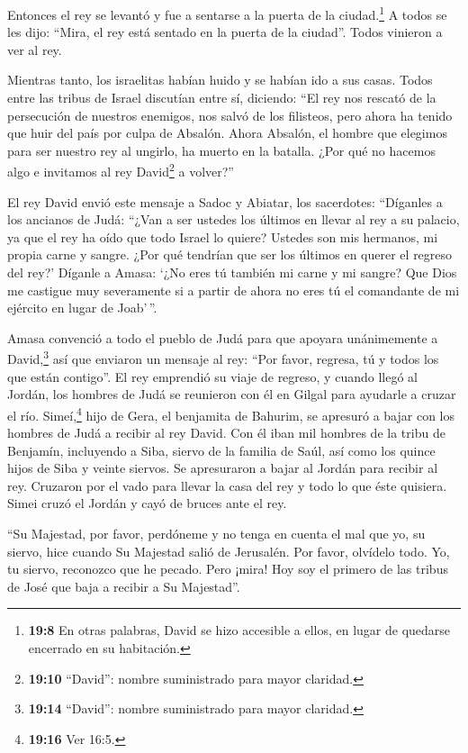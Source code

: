  Entonces el rey se levantó y fue a sentarse a la puerta de
la ciudad.\footnote{\textbf{19:8} En otras palabras, David se hizo
  accesible a ellos, en lugar de quedarse encerrado en su habitación.} A
todos se les dijo: ``Mira, el rey está sentado en la puerta de la
ciudad''. Todos vinieron a ver al rey.

Mientras tanto, los israelitas habían huido y se habían ido a sus casas.
 Todos entre las tribus de Israel discutían entre sí,
diciendo: ``El rey nos rescató de la persecución de nuestros enemigos,
nos salvó de los filisteos, pero ahora ha tenido que huir del país por
culpa de Absalón.  Ahora Absalón, el hombre que elegimos
para ser nuestro rey al ungirlo, ha muerto en la batalla. ¿Por qué no
hacemos algo e invitamos al rey David\footnote{\textbf{19:10} ``David'':
  nombre suministrado para mayor claridad.} a volver?''

 El rey David envió este mensaje a Sadoc y Abiatar, los
sacerdotes: ``Díganles a los ancianos de Judá: ``¿Van a ser ustedes los
últimos en llevar al rey a su palacio, ya que el rey ha oído que todo
Israel lo quiere?  Ustedes son mis hermanos, mi propia
carne y sangre. ¿Por qué tendrían que ser los últimos en querer el
regreso del rey?'  Díganle a Amasa: `¿No eres tú también mi
carne y mi sangre? Que Dios me castigue muy severamente si a partir de
ahora no eres tú el comandante de mi ejército en lugar de Joab'\,''.

 Amasa convenció a todo el pueblo de Judá para que apoyara
unánimemente a David,\footnote{\textbf{19:14} ``David'': nombre
  suministrado para mayor claridad.} así que enviaron un mensaje al rey:
``Por favor, regresa, tú y todos los que están contigo''. 
El rey emprendió su viaje de regreso, y cuando llegó al Jordán, los
hombres de Judá se reunieron con él en Gilgal para ayudarle a cruzar el
río.  Simeí,\footnote{\textbf{19:16} Ver 16:5.} hijo de
Gera, el benjamita de Bahurim, se apresuró a bajar con los hombres de
Judá a recibir al rey David.  Con él iban mil hombres de la
tribu de Benjamín, incluyendo a Siba, siervo de la familia de Saúl, así
como los quince hijos de Siba y veinte siervos. Se apresuraron a bajar
al Jordán para recibir al rey.  Cruzaron por el vado para
llevar la casa del rey y todo lo que éste quisiera. Simei cruzó el
Jordán y cayó de bruces ante el rey.

 ``Su Majestad, por favor, perdóneme y no tenga en cuenta
el mal que yo, su siervo, hice cuando Su Majestad salió de Jerusalén.
Por favor, olvídelo todo.  Yo, tu siervo, reconozco que he
pecado. Pero ¡mira! Hoy soy el primero de las tribus de José que baja a
recibir a Su Majestad''.

